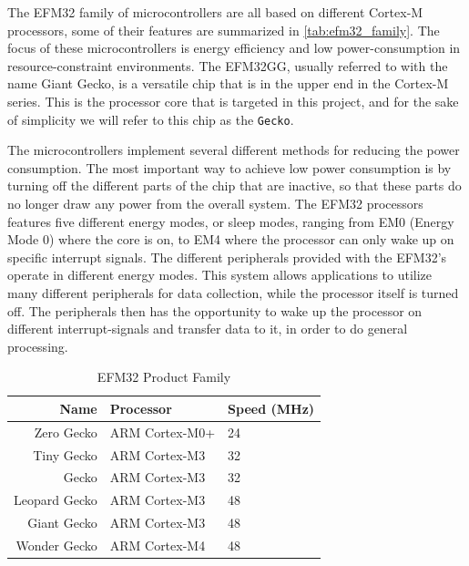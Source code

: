 The EFM32 family of microcontrollers are all based on different Cortex-M processors, some of their features are summarized in \autoref{tab:efm32_family}.
The focus of these microcontrollers is energy efficiency and low power-consumption in resource-constraint environments.
The EFM32GG, usually referred to with the name Giant Gecko, is a versatile chip that is in the upper end in the Cortex-M series.
This is the processor core that is targeted in this project, and for the sake of simplicity we will refer to this chip as the \texttt{Gecko}.

The microcontrollers implement several different methods for reducing the power consumption.
The most important way to achieve low power consumption is by turning off the different parts of the chip that are inactive, so that these parts do no longer draw any power from the overall system.
The EFM32 processors features five different energy modes, or sleep modes, ranging from EM0 (Energy Mode 0) where the core is on, to EM4 where the processor can only wake up on specific interrupt signals.
The different peripherals provided with the EFM32's operate in different energy modes.
This system allows applications to utilize many different peripherals for data collection, while the processor itself is turned off.
The peripherals then has the opportunity to wake up the processor on different interrupt-signals and transfer data to it, in order to do general processing.

\begin{table}[b]
\begin{center}
    \begin{tabular}{r|l|l}
    \textbf{Name} & \textbf{Processor} & \textbf{Speed (MHz)} \\
    \hline
    Zero Gecko    & ARM Cortex-M0+ & 24 \\
    Tiny Gecko    & ARM Cortex-M3  & 32 \\
    Gecko         & ARM Cortex-M3  & 32 \\
    Leopard Gecko & ARM Cortex-M3  & 48 \\
    Giant Gecko   & ARM Cortex-M3  & 48 \\
    Wonder Gecko  & ARM Cortex-M4  & 48 \\
    \hline
    \end{tabular}
\end{center}
\caption{EFM32 Product Family \cite{web:silabs}}
\label{tab:efm32_family}
\end{table}


